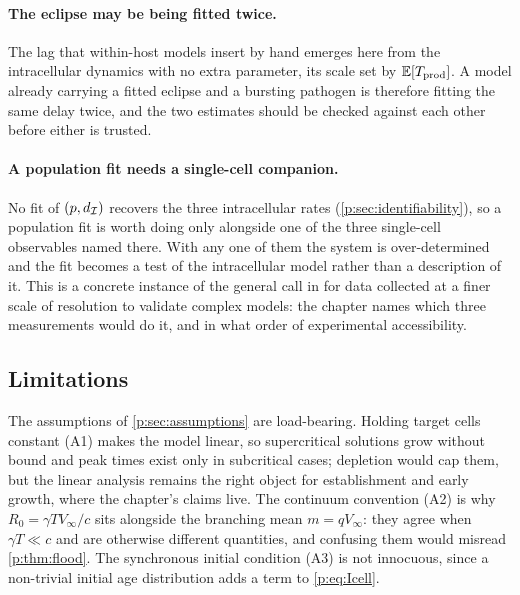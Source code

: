 \paragraph{The eclipse may be being fitted twice.} The lag that within-host
models insert by hand emerges here from the intracellular dynamics with no
extra parameter, its scale set by $\mathbb{E}\!\left[T_{\rm prod}\right]$. A model already
carrying a fitted eclipse and a bursting pathogen is therefore fitting the
same delay twice, and the two estimates should be checked against each other
before either is trusted.

\paragraph{A population fit needs a single-cell companion.} No fit of
$(p,d_{\mathcal{I}})$ recovers the three intracellular rates
(\cref{p:sec:identifiability}), so a population fit is worth doing only
alongside one of the three single-cell observables named there. With any one
of them the system is over-determined and the fit becomes a test of the
intracellular model rather than a description of it. This is a concrete
instance of the general call in \cite{ciupe2024incorporating} for data
collected at a finer scale of resolution to validate complex models: the
chapter names which three measurements would do it, and in what order of
experimental accessibility.

\subsection{Limitations}
\label{p:sec:limitations}

The assumptions of \cref{p:sec:assumptions} are load-bearing. Holding target
cells constant (A1) makes the model linear, so supercritical solutions grow
without bound and peak times exist only in subcritical cases; depletion
would cap them, but the linear analysis remains the right object for
establishment and early growth, where the chapter's claims live. The
continuum convention (A2) is why $R_0=\gamma TV_\infty/c$ sits alongside the
branching mean $m=qV_\infty$: they agree when $\gamma T\ll c$ and are
otherwise different quantities, and confusing them would misread
\cref{p:thm:flood}. The synchronous initial condition (A3) is not innocuous,
since a non-trivial initial age distribution adds a term to
\cref{p:eq:Icell}.

